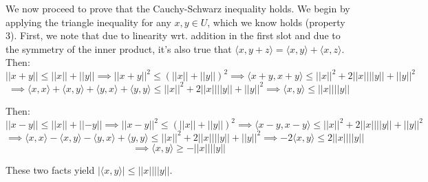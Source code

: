 \begin{solution}
\begin{itemize}
    We now proceed to prove that the Cauchy-Schwarz inequality holds. We begin by applying the triangle inequality for any $x, y \in U$, which we know holds (property 3). First, we note that due to linearity wrt. addition in the first slot and due to the symmetry of the inner product, it's also true that $\langle x, y + z \rangle = \langle x, y \rangle + \langle x, z \rangle$. Then:
    $$\lvert \lvert x + y \rvert \rvert \leq \lvert \lvert x \rvert \rvert + \lvert \lvert y \rvert \rvert \implies \lvert \lvert x + y \rvert \rvert^2 \leq (\lvert \lvert x \rvert \rvert + \lvert \lvert y \rvert \rvert)^2 \implies \langle x + y, x + y \rangle \leq \lvert \lvert x \rvert \rvert^2 + 2 \lvert \lvert x \rvert \rvert \lvert \lvert y \rvert \rvert + \lvert \lvert y \rvert \rvert^2$$
    $$\implies \langle x, x \rangle + \langle x, y \rangle + \langle y, x \rangle + \langle y, y \rangle \leq \lvert \lvert x \rvert \rvert^2 + 2 \lvert \lvert x \rvert \rvert \lvert \lvert y \rvert \rvert + \lvert \lvert y \rvert \rvert^2 \implies \langle x, y \rangle \leq \lvert \lvert x \rvert \rvert \lvert \lvert y \rvert \rvert$$

    Then:
    $$\lvert \lvert x - y \rvert \rvert \leq \lvert \lvert x \rvert \rvert + \lvert \lvert - y \rvert \rvert \implies \lvert \lvert x - y \rvert \rvert^2 \leq (\lvert \lvert x \rvert \rvert + \lvert \lvert y \rvert \rvert)^2 \implies \langle x - y, x - y \rangle \leq \lvert \lvert x \rvert \rvert^2 + 2\lvert \lvert x \rvert \rvert \lvert \lvert y \rvert \rvert + \lvert \lvert y \rvert \rvert^2$$
    $$\implies \langle x, x \rangle - \langle x, y \rangle - \langle y, x \rangle + \langle y, y \rangle \leq \lvert \lvert x \rvert \rvert^2 + 2\lvert \lvert x \rvert \rvert \lvert \lvert y \rvert \rvert + \lvert \lvert y \rvert \rvert^2 \implies -2\langle x, y \rangle \leq 2\lvert \lvert x \rvert \rvert \lvert \lvert y \rvert \rvert $$
    $$\implies \langle x, y \rangle \geq - \lvert \lvert x \rvert \rvert \lvert \lvert y \rvert \rvert$$

    These two facts yield $\lvert \langle x, y \rangle \rvert \leq \lvert \lvert x \rvert \rvert \lvert \lvert y \rvert \rvert$.


\end{itemize}
\end{solution}
